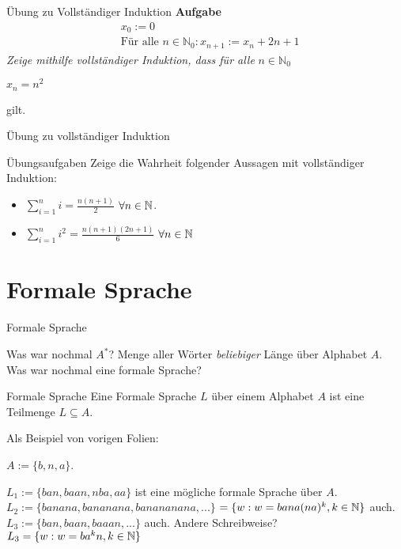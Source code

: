 \begin{frame}{Übung zu Vollständiger Induktion}
	\textbf{Aufgabe}\\
	\begin{eqnarray*}
		&x_0 := 0\\
		&\text{Für alle } n \in \mathbb{N}_0: x_{n+1} := x_n + 2n +1
	\end{eqnarray*}			
	\textit{Zeige mithilfe vollständiger Induktion, dass für alle} $n \in \mathbb{N}_0$ \\
	\begin{center}$x_n = n^2$\end{center}
	gilt.
\end{frame}

\begin{frame}{Übung zu vollständiger Induktion}
	\begin{taskblock}{Übungsaufgaben}
		Zeige die Wahrheit folgender Aussagen mit vollständiger Induktion:
		
		\begin{itemize}
			\item $\sum\limits_{i=1}^n i = \frac{n(n+1)}{2}$ $\forall n \in \mathbb{N}$.
			\item $\sum\limits_{i=1}^n i^2 = \frac{n(n+1)(2n+1)}{6}$ $\forall n \in \mathbb{N}$
		\end{itemize}
	\end{taskblock}
\end{frame}

\section{Formale Sprache}

\begin{frame}{Formale Sprache}
	\begin{itemize}
		\pitem Was war nochmal $A^*$? Menge aller Wörter \emph{beliebiger} Länge über Alphabet $A$.
		\pitem Was war nochmal eine formale Sprache?
	\end{itemize}
	
	\pause
	
	\begin{block}{Formale Sprache}
		Eine Formale Sprache $L$ \pause über einem Alphabet $A$ ist eine Teilmenge $L \subseteq A$.
	\end{block}

	\pause Als Beispiel von vorigen Folien:
	
	\begin{itemize}
		\pitem $A := \{b, n, a\}$.
		\begin{itemize}
			\pitem $L_1 := \{ban, baan, nba, aa\}$ ist eine mögliche formale Sprache über $A$.
			\pitem $L_2 := \{banana, bananana, banananana, ...\}$ \pause $ = \{w : w = bana(na)^k, k \in \mathbb{N}\}$ auch.
			\pitem $L_3 := \{ban, baan, baaan, ...\}$ auch. \pause Andere Schreibweise? \pause \\ $ L_3 = \{w : w = ba^kn, k \in \mathbb{N} \}$
		\end{itemize}
	\end{itemize}
\end{frame}


